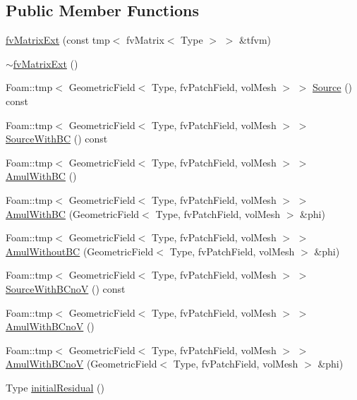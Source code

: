 \subsection*{Public Member Functions}
\begin{DoxyCompactItemize}
\item 
\hyperlink{classFoam_1_1fvMatrixExt_a5553b6a9b6f40731de6b5b41c97d3697}{fv\+Matrix\+Ext} (const tmp$<$ fv\+Matrix$<$ Type $>$ $>$ \&tfvm)
\item 
\hyperlink{classFoam_1_1fvMatrixExt_af9ead4a5f5f86d06dd03436fc3460dfa}{$\sim$fv\+Matrix\+Ext} ()
\item 
Foam\+::tmp$<$ Geometric\+Field$<$ Type, fv\+Patch\+Field, vol\+Mesh $>$ $>$ \hyperlink{classFoam_1_1fvMatrixExt_a8202444f538ab2e397acd65a5e549cfc}{Source} () const
\item 
Foam\+::tmp$<$ Geometric\+Field$<$ Type, fv\+Patch\+Field, vol\+Mesh $>$ $>$ \hyperlink{classFoam_1_1fvMatrixExt_a47adbe43dd04513204192fa9cc972697}{Source\+With\+BC} () const
\item 
Foam\+::tmp$<$ Geometric\+Field$<$ Type, fv\+Patch\+Field, vol\+Mesh $>$ $>$ \hyperlink{classFoam_1_1fvMatrixExt_a92a1ef4a5919e16ab275a09cb9028a0e}{Amul\+With\+BC} ()
\item 
Foam\+::tmp$<$ Geometric\+Field$<$ Type, fv\+Patch\+Field, vol\+Mesh $>$ $>$ \hyperlink{classFoam_1_1fvMatrixExt_adadb52bbcd03e8b49a365d279fc48cd8}{Amul\+With\+BC} (Geometric\+Field$<$ Type, fv\+Patch\+Field, vol\+Mesh $>$ \&phi)
\item 
Foam\+::tmp$<$ Geometric\+Field$<$ Type, fv\+Patch\+Field, vol\+Mesh $>$ $>$ \hyperlink{classFoam_1_1fvMatrixExt_a83179ba7b0f08c82c14954c31fec6db1}{Amul\+Without\+BC} (Geometric\+Field$<$ Type, fv\+Patch\+Field, vol\+Mesh $>$ \&phi)
\item 
Foam\+::tmp$<$ Geometric\+Field$<$ Type, fv\+Patch\+Field, vol\+Mesh $>$ $>$ \hyperlink{classFoam_1_1fvMatrixExt_a44a5b36e54aac97af931fe93997f3977}{Source\+With\+B\+CnoV} () const
\item 
Foam\+::tmp$<$ Geometric\+Field$<$ Type, fv\+Patch\+Field, vol\+Mesh $>$ $>$ \hyperlink{classFoam_1_1fvMatrixExt_acc7d8008ecb80544ac37be6789cfe283}{Amul\+With\+B\+CnoV} ()
\item 
Foam\+::tmp$<$ Geometric\+Field$<$ Type, fv\+Patch\+Field, vol\+Mesh $>$ $>$ \hyperlink{classFoam_1_1fvMatrixExt_af6e349943da5be08e4b07a96a8c1f647}{Amul\+With\+B\+CnoV} (Geometric\+Field$<$ Type, fv\+Patch\+Field, vol\+Mesh $>$ \&phi)
\item 
Type \hyperlink{classFoam_1_1fvMatrixExt_ae32aa75daaa6ad3b0f6c0eb29348a878}{initial\+Residual} ()
\end{DoxyCompactItemize}


